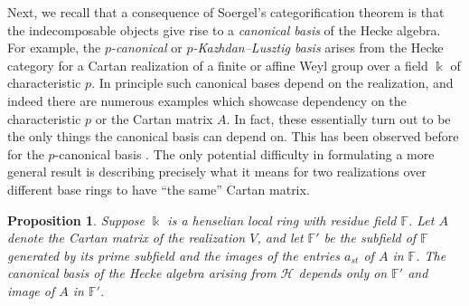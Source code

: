 \documentclass{amsart}
\theoremstyle{plain}
\newtheorem{prop}[thm]{Proposition}
\theoremstyle{definition}
\theoremstyle{remark}
\newtheorem{rem}[thm]{Remark}
\numberwithin{equation}{section}
\newcommand{\defnemph}[1]{\emph{#1}}
\begin{document}

Next, we recall that a consequence of Soergel's categorification theorem is that the indecomposable objects give rise to a \defnemph{canonical basis} of the Hecke algebra. 
For example, the \defnemph{$p$-canonical} or \defnemph{$p$-Kazhdan--Lusztig basis} arises from the Hecke category for a Cartan realization of a finite or affine Weyl group over a field $\Bbbk$ of characteristic $p$. 
In principle such canonical bases depend on the realization, and indeed there are numerous examples which showcase dependency on the characteristic $p$ or the Cartan matrix $A$. 
In fact, these essentially turn out to be the only things the canonical basis can depend on. 
This has been observed before for the $p$-canonical basis \cite[Remark~10.17(2)]{rw-tilting}. 
The only potential difficulty in formulating a more general result is describing precisely what it means for two realizations over different base rings to have ``the same'' Cartan matrix.

\begin{prop}
Suppose $\Bbbk$ is a henselian local ring with residue field $\mathbb{F}$. 
Let $A$ denote the Cartan matrix of the realization $V$, and let $\mathbb{F}'$ be the subfield of $\mathbb{F}$ generated by its prime subfield and the images of the entries $a_{st}$ of $A$ in $\mathbb{F}$. 
The canonical basis of the Hecke algebra arising from $\mathcal{H}$ depends only on $\mathbb{F}'$ and image of $A$ in $\mathbb{F}'$. 
\end{prop}
\end{document}
